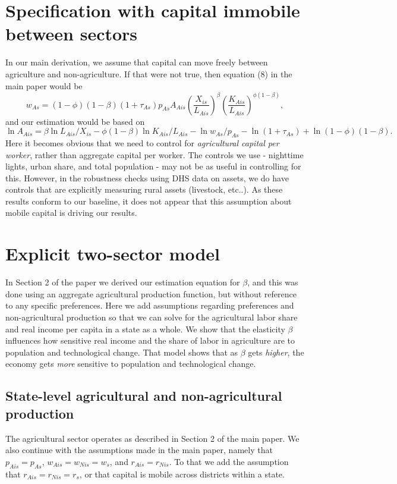 \documentclass[11pt]{article}
\begin{document}
\section{Specification with capital immobile between sectors}
In our main derivation, we assume that capital can move freely between agriculture and non-agriculture. If that were not true, then equation (8) in the main paper would be
\begin{equation}
    w_{As} = (1-\phi)(1-\beta) (1+\tau_{As}) p_{As} A_{Ais} \left(\frac{X_{is}}{L_{Ais}}\right)^{\beta} \left(\frac{K_{Ais}}{L_{Ais}}\right)^{\phi(1-\beta)},
\end{equation}
and our estimation would be based on
\begin{equation}
    \ln A_{Ais} = \beta \ln L_{Ais}/X_{is} - \phi(1-\beta) \ln K_{Ais}/L_{Ais} - \ln w_{As}/p_{As} - \ln (1+\tau_{As}) + \ln (1-\phi)(1-\beta).
\end{equation}
Here it becomes obvious that we need to control for \textit{agricultural capital per worker}, rather than aggregate capital per worker. The controls we use - nighttime lights, urban share, and total population - may not be as useful in controlling for this. However, in the robustness checks using DHS data on assets, we do have controls that are explicitly measuring rural assets (livestock, etc..). As these results conform to our baseline, it does not appear that this assumption about mobile capital is driving our results. 

\section{Explicit two-sector model}\label{APP_solve}
In Section 2 of the paper we derived our estimation equation for $\beta$, and this was done using an aggregate agricultural production function, but without reference to any specific preferences. Here we add assumptions regarding preferences and non-agricultural production so that we can solve for the agricultural labor share and real income per capita in a state as a whole. We show that the elasticity $\beta$ influences how sensitive real income and the share of labor in agriculture are to population and technological change. That model shows that as $\beta$ gets \textit{higher}, the economy gets \textit{more} sensitive to population and technological change.

\subsection{State-level agricultural and non-agricultural production}
The agricultural sector operates as described in Section 2 of the main paper. We also continue with the assumptions made in the main paper, namely that $p_{Ais} = p_{As}$, $w_{Ais} = w_{Nis} = w_{s}$, and $r_{Ais} = r_{Nis}$. To that we add the assumption that $r_{Ais} = r_{Nis} = r_{s}$, or that capital is mobile across districts within a state. 
\end{document}
